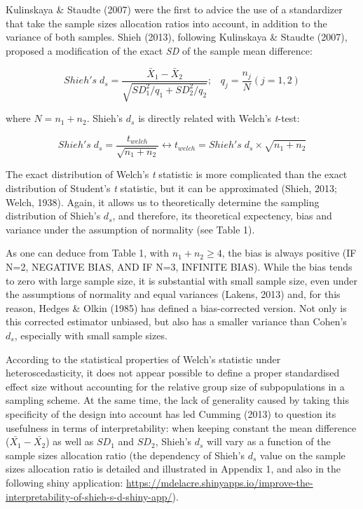 \documentclass[
  man,floatsintext]{apa6}
\begin{document}
Kulinskaya \& Staudte (2007) were the first to advice the use of a standardizer that take the sample sizes allocation ratios into account, in addition to the variance of both samples. Shieh (2013), following Kulinskaya \& Staudte (2007), proposed a modification of the exact \emph{SD} of the sample mean difference:

\begin{equation} 
Shieh's \; d_s = \frac{\bar{X}_1 - \bar{X}_2}{\sqrt{SD_1^2/q_1+SD_2^2/q_2}}; \;\;\; q_j=\frac{n_j}{N} (j=1,2)
\label{eq:Shiehds}
\end{equation}

where \(N = n_1+n_2\). Shieh's \(d_{s}\) is directly related with Welch's \emph{t}-test:

\begin{equation} 
Shieh's \; d_s = \frac{t_{welch}}{\sqrt{n_1+n_2}} \leftrightarrow t_{welch} = Shieh's \; d_s \times \sqrt{n_1+n_2}
\label{eq:shiehvswelch}
\end{equation}

The exact distribution of Welch's \emph{t} statistic is more complicated than the exact distribution of Student's \emph{t} statistic, but it can be approximated (Shieh, 2013; Welch, 1938).
Again, it allows us to theoretically determine the sampling distribution of Shieh's \(d_s\), and therefore, its theoretical expectency, bias and variance under the assumption of normality (see Table 1).

As one can deduce from Table 1, with \(n_1+n_2 \ge 4\), the bias is always positive (IF N=2, NEGATIVE BIAS, AND IF N=3, INFINITE BIAS). While the bias tends to zero with large sample size, it is substantial with small sample size, even under the assumptions of normality and equal variances (Lakens, 2013) and, for this reason, Hedges \& Olkin (1985) has defined a bias-corrected version. Not only is this corrected estimator unbiased, but also has a smaller variance than Cohen's \(d_s\), especially with small sample sizes.

According to the statistical properties of Welch's statistic under heteroscedasticity, it does not appear possible to define a proper standardised effect size without accounting for the relative group size of subpopulations in a sampling scheme. At the same time, the lack of generality caused by taking this specificity of the design into account has led Cumming (2013) to question its usefulness in terms of interpretability: when keeping constant the mean difference (\(\bar{X_1}-\bar{X_2}\)) as well as \(SD_1\) and \(SD_2\), Shieh's \(d_s\) will vary as a function of the sample sizes allocation ratio (the dependency of Shieh's \(d_s\) value on the sample sizes allocation ratio is detailed and illustrated in Appendix 1, and also in the following shiny application: \url{https://mdelacre.shinyapps.io/improve-the-interpretability-of-shieh-s-d-shiny-app/}).
\end{document}
